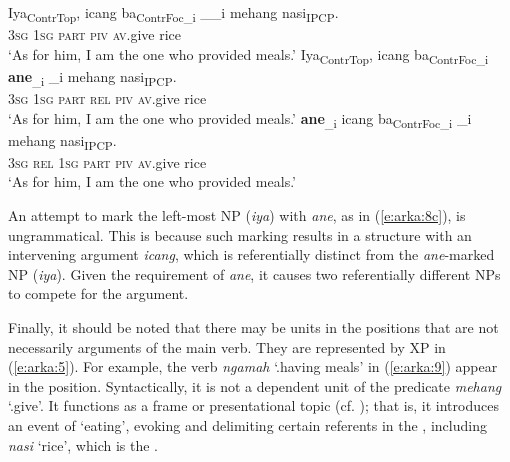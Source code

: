 \documentclass[output=paper
,modfonts
,nonflat]{langsci/langscibook}
\begin{document}
\begin{exe}
	\ex\label{e:arka:8}
	\begin{xlist}
		\ex\label{e:arka:8a}
		\gll {\ob}Iya{\cb}\textsubscript{ContrTop}, {\ob}{\ob}icang  ba{\cb}\textsubscript{ContrFoc\_i}  {\ob}\_\_i  mehang   nasi{\cb}\textsubscript{IP}{\cb}\textsubscript{CP}.\\
		\phantom{[}3\textsc{sg} \phantom{[[]}1\textsc{sg} \textsc{part} \phantom{[}\textsc{piv}  \textsc{av}.give rice\\
		\glt ‘As for him, I am the one who provided meals.’
		\ex\label{e:arka:8b}
		\gll {\ob}Iya{\cb}\textsubscript{ContrTop}, {\ob}icang   ba{\cb}\textsubscript{ContrFoc\_i}  {\ob}\textbf{ane}\textsubscript{\_i}  {\ob}\_i mehang nasi{\cb}\textsubscript{IP}{\cb}\textsubscript{CP}.\\
		\phantom{[}3\textsc{sg}      \phantom{[}1\textsc{sg}  \textsc{part}     \phantom{[}\textsc{rel}   \phantom{[}\textsc{piv}  \textsc{av}.give   rice\\
		\glt ‘As for him, I am the one who provided meals.’
		\ex\label{e:arka:8c}
		  \textbf{ane}\textsubscript{\_i} {\ob}icang   ba{\cb}\textsubscript{ContrFoc\_i}  {\ob}\_i mehang  nasi{\cb}\textsubscript{IP}{\cb}\textsubscript{CP}.\\
		\phantom{*[}3\textsc{sg}      \textsc{rel}  1\textsc{sg}  \textsc{part}        \textsc{piv}  \textsc{av}.give  rice\\
		\glt ‘As for him, I am the one who provided meals.’
	\end{xlist}
\end{exe}

\noindent
An attempt to mark the left-most NP (\textit{iya}) with \textit{ane}, as in (\ref{e:arka:8c}), is ungrammatical. This is because such marking results in a structure with an intervening argument \textit{icang}, which is referentially distinct from the \textit{ane}-marked NP (\textit{iya}). Given the requirement of \textit{ane}, it causes two referentially different NPs to compete for the  argument. 

Finally, it should be noted that there may be units in the  positions that are not necessarily arguments of the main verb. They are represented by XP in (\ref{e:arka:5}). For example, the verb \textit{ngamah} ‘.having meals’ in (\ref{e:arka:9}) appear in the  position. Syntactically, it is not a dependent unit of the predicate \textit{mehang} ‘.give’. It functions as a frame or presentational topic (cf. \citealt[177--181]{Lambrecht1994}); that is, it introduces an event of ‘eating’, evoking and delimiting certain referents in the , including \textit{nasi} ‘rice’, which is the .
\end{document}
